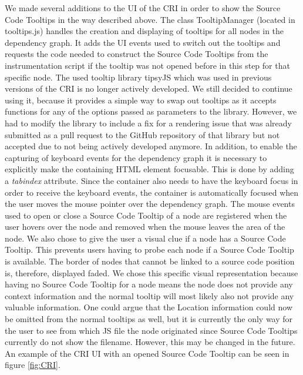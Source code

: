 We made several additions to the UI of the CRI in order to show the Source Code Tooltips in the way described above. The class TooltipManager (located in tooltips.js) handles the creation and displaying of tooltips for all nodes in the dependency graph. It adds the UI events used to switch out the tooltips and requests the code needed to construct the Source Code Tooltips from the instrumentation script if the tooltip was not opened before in this step for that specific node. The used tooltip library tipsyJS \cite{Tipsy} which was used in previous versions of the CRI is no longer actively developed. We still decided to continue using it, because it provides a simple way to swap out tooltips as it accepts functions for any of the options passed as parameters to the library. However, we had to modify the library to include a fix for a rendering issue that was already submitted as a pull request to the GitHub repository of that library but not accepted due to not being actively developed anymore. In addition, to enable the capturing of keyboard events for the dependency graph it is necessary to explicitly make the containing HTML element focusable. This is done by adding a \emph{tabindex} attribute. Since the container also needs to have the keyboard focus in order to receive the keyboard events, the container is automatically focused when the user moves the mouse pointer over the dependency graph. The mouse events used to open or close a Source Code Tooltip of a node are registered when the user hovers over the node and removed when the mouse leaves the area of the node. We also chose to give the user a visual clue if a node has a Source Code Tooltip. This prevents users having to probe each node if a Source Code Tooltip is available. The border of nodes that cannot be linked to a source code position is, therefore, displayed faded. We chose this specific visual representation because having no Source Code Tooltip for a node means the node does not provide any context information and the normal tooltip will most likely also not provide any valuable information. One could argue that the Location information could now be omitted from the normal tooltips as well, but it is currently the only way for the user to see from which JS file the node originated since Source Code Tooltips currently do not show the filename. However, this may be changed in the future. An example of the CRI UI with an opened Source Code Tooltip can be seen in figure \ref{fig:CRI}.
	
